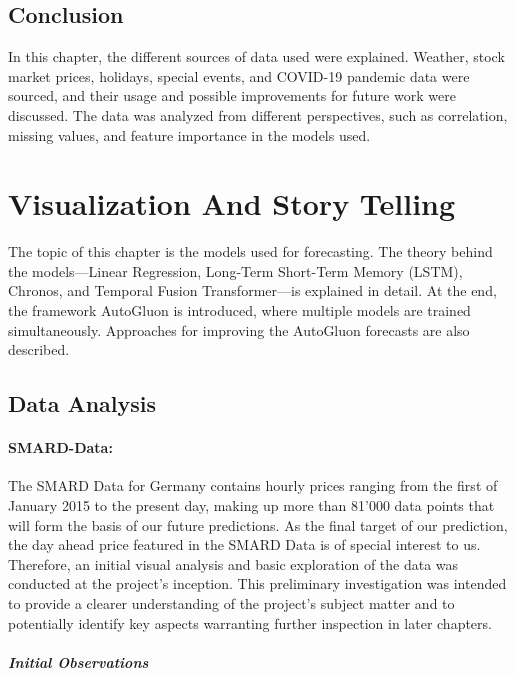 \documentclass[a4paper]{article}
\begin{document}
    \subsection{Conclusion}\label{conclusion}

In this chapter, the different sources of data used were explained.
Weather, stock market prices, holidays, special events, and COVID-19
pandemic data were sourced, and their usage and possible improvements
for future work were discussed. The data was analyzed from different
perspectives, such as correlation, missing values, and feature
importance in the models used.

    \section{Visualization And Story
Telling}\label{visualization-and-story-telling}

    The topic of this chapter is the models used for forecasting. The theory
behind the models---Linear Regression, Long-Term Short-Term Memory
(LSTM), Chronos, and Temporal Fusion Transformer---is explained in
detail. At the end, the framework AutoGluon is introduced, where
multiple models are trained simultaneously. Approaches for improving the
AutoGluon forecasts are also described.

    \subsection{Data Analysis}\label{data-analysis}

\paragraph{SMARD-Data:}\label{smard-data}

The SMARD Data for Germany contains hourly prices ranging from the first
of January 2015 to the present day, making up more than 81'000 data
points that will form the basis of our future predictions. As the final
target of our prediction, the day ahead price featured in the SMARD Data
is of special interest to us. Therefore, an initial visual analysis and
basic exploration of the data was conducted at the project's inception.
This preliminary investigation was intended to provide a clearer
understanding of the project's subject matter and to potentially
identify key aspects warranting further inspection in later chapters.

\subparagraph{Initial Observations}\label{initial-observations}
\end{document}
